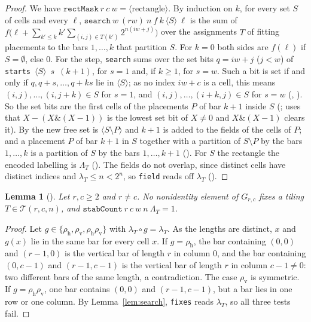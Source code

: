 \documentclass[11pt]{amsart}
\theoremstyle{plain}
\newtheorem{lemma}[theorem]{Lemma}
\theoremstyle{definition}
\newcommand{\code}[1]{\texttt{#1}}
\newcommand{\T}{\mathcal{T}}
\begin{document}
\begin{proof}
We have $\code{rectMask}\ r\ c\ w=\langle\text{rectangle}\rangle$. By induction on $k$, for every set $S$ of cells and every $\ell$, $\code{search}\ w\ (rw)\ n\ f\ k\ \langle S\rangle\ \ell$ is the sum of $f\bigl(\ell+\sum_{k'\le k}k'\sum_{(i,j)\in T(k')}2^{n(iw+j)}\bigr)$ over the assignments $T$ of fitting placements to the bars $1,\dots,k$ that partition $S$. For $k=0$ both sides are $f(\ell)$ if $S=\emptyset$, else $0$. For the step, \code{search} sums over the set bits $q=iw+j$ ($j<w$) of \code{starts}~$\langle S\rangle$~$s$~$(k+1)$, for $s=1$ and, if $k\ge1$, for $s=w$. Such a bit is set if and only if $q,q+s,\dots,q+ks$ lie in $\langle S\rangle$; as no index $iw+c$ is a cell, this means $(i,j),\dots,(i,j+k)\in S$ for $s=1$, and $(i,j),\dots,(i+k,j)\in S$ for $s=w$ (, ). So the set bits are the first cells of the placements $P$ of bar $k+1$ inside $S$ (;  uses that $X-(X\mathbin{\&}(X-1))$ is the lowest set bit of $X\ne0$ and $X\mathbin{\&}(X-1)$ clears it). By  the new free set is $\langle S\setminus P\rangle$ and $k+1$ is added to the fields of the cells of $P$; and a placement $P$ of bar $k+1$ in $S$ together with a partition of $S\setminus P$ by the bars $1,\dots,k$ is a partition of $S$ by the bars $1,\dots,k+1$ (). For $S$ the rectangle the encoded labelling is $\Lambda_T$ (). The fields do not overlap, since distinct cells have distinct indices and $\lambda_T\le n<2^n$, so \code{field} reads off $\lambda_T$ ().
\end{proof}

\begin{lemma}[]\label{lem:nosym}
Let $r,c\ge2$ and $r\ne c$. No nonidentity element of $G_{r,c}$ fixes a tiling $T\in\T(r,c,n)$, and $\code{stabCount}\ r\ c\ w\ n\ \Lambda_T=1$.
\end{lemma}

\begin{proof}
Let $g\in\{\rho_{\mathrm h},\rho_{\mathrm v},\rho_{\mathrm h}\rho_{\mathrm v}\}$ with $\lambda_T\circ g=\lambda_T$. As the lengths are distinct, $x$ and $g(x)$ lie in the same bar for every cell $x$. If $g=\rho_{\mathrm h}$, the bar containing $(0,0)$ and $(r-1,0)$ is the vertical bar of length $r$ in column $0$, and the bar containing $(0,c-1)$ and $(r-1,c-1)$ is the vertical bar of length $r$ in column $c-1\ne0$: two different bars of the same length, a contradiction. The case $\rho_{\mathrm v}$ is symmetric. If $g=\rho_{\mathrm h}\rho_{\mathrm v}$, one bar contains $(0,0)$ and $(r-1,c-1)$, but a bar lies in one row or one column. By Lemma~\ref{lem:search}, \code{fixes} reads $\lambda_T$, so all three tests fail.
\end{proof}
\end{document}
